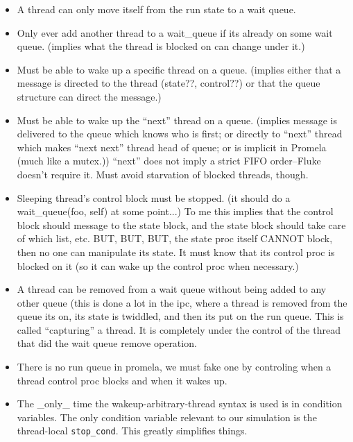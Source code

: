 \begin{itemize}
\item A thread can only move itself from the run state to a wait
queue.  

\item Only ever add another thread to a wait_queue if its already on some
wait queue.  (implies what the thread is blocked on can change under
it.)

\item Must be able to wake up a specific thread on a queue.  (implies either
that a message is directed to the thread (state??, control??) or that
the queue structure can direct the message.)

\item Must be able to wake up the ``next'' thread on a queue. (implies message
is delivered to the queue which knows who is first; or directly to
``next'' thread which makes ``next next'' thread head of queue; or
is implicit in Promela (much like a mutex.))  ``next'' does not imply
a strict FIFO order--Fluke doesn't require it.  Must avoid starvation
of blocked threads, though.

\item Sleeping thread's control block must be stopped. (it should do a
wait_queue(foo, self) at some point...)  To me this implies that the
control block should message to the state block, and the state block
should take care of which list, etc.  BUT, BUT, BUT, the state proc
itself CANNOT block, then no one can manipulate its state.  It must
know that its control proc is blocked on it (so it can wake up the
control proc when necessary.)

\item A thread can be removed from a wait queue without being added to
any other queue (this is done a lot in the ipc, where a thread
is removed from the queue its on, its state is twiddled, and
then its put on the run queue.  This is called ``capturing'' a thread.
It is completely under the control of the thread that did the wait
queue remove operation.

\item There is no run queue in promela, we must fake one by controling
when a thread control proc blocks and when it wakes up.

\item The _only_ time the wakeup-arbitrary-thread syntax is used is
in condition variables.  The only condition variable relevant to
our simulation is the thread-local {\tt stop_cond}.  This greatly
simplifies things.
\end{itemize}

